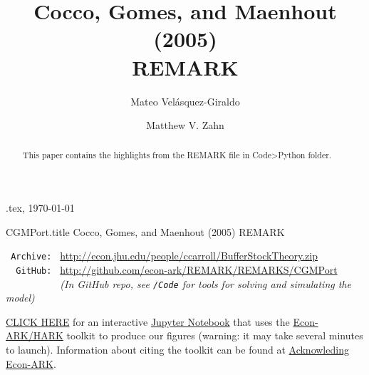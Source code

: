 \documentclass[./CGMPort.tex]{subfiles}
\begin{document}
\hfill{\tiny \texname.tex, \today}

\begin{verbatimwrite}{CGMPort.title}  %
Cocco, Gomes, and Maenhout (2005) REMARK
\end{verbatimwrite}

\title{Cocco, Gomes, and Maenhout (2005) \\ REMARK}

\author{Mateo Vel\'asquez-Giraldo \and Matthew V. Zahn}



\maketitle 

\hypertarget{abstract}{}
\begin{abstract}
This paper contains the highlights from the REMARK file in Code>Python folder.
\end{abstract}

\hypertarget{links}{}
\begin{small}
\parbox{\textwidth}{
\begin{center}
\begin{tabbing}
\texttt{~Archive:~} \= \= \url{http://econ.jhu.edu/people/ccarroll/BufferStockTheory.zip} \kill \\  %
\texttt{~~GitHub:~} \> \> \url{http://github.com/econ-ark/REMARK/REMARKS/CGMPort} \\
\texttt{~~~~~~~~~~} \> \> \textit{(In GitHub repo, see \texttt{/Code} for tools for solving and simulating the model)} \\
\end{tabbing}
\end{center}
          
\href{https://mybinder.org/v2/gh/matthew-zahn/CGMPort/develop?filepath=REMARK\%2FCGM_REMARK.ipynb}{CLICK HERE} for an interactive \href{https://en.wikipedia.org/wiki/Project\_Jupyter\#Jupyter_Notebook}{Jupyter Notebook} that uses the \href{https://econ-ark/HARK}{Econ-ARK/HARK} toolkit to produce our figures (warning: it may take several minutes to launch).  Information about citing the toolkit can be found at \href{https://econ-ark.org/acknowledging/}{Acknowleding Econ-ARK}.
} %
\end{small}

\begin{authorsinfo}
\end{authorsinfo}
\end{document}
